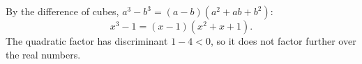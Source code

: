 By the difference of cubes, $a^3-b^3=(a-b)\left(a^2+ab+b^2\right)$:
\[x^3-1=\boxed{(x-1)\left(x^2+x+1\right)}.\]
The quadratic factor has discriminant $1-4<0$, so it does not factor further over the real numbers.
